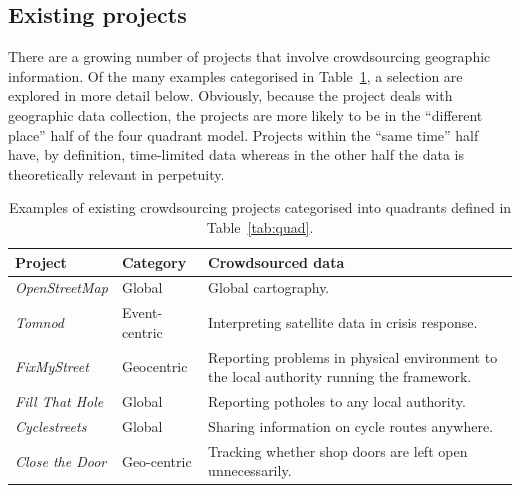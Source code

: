 \documentclass{article}
\begin{document}
		\subsection{Existing projects}
		There are a growing number of projects that involve crowdsourcing geographic information. Of the many examples categorised in Table~\ref{tab:existing-projects}, a selection are explored in more detail below. Obviously, because the project deals with geographic data collection, the projects are more likely to be in the ``different place'' half of the four quadrant model. Projects within the ``same time'' half have, by definition, time-limited data whereas in the other half the data is theoretically relevant in perpetuity.

		\begin{table}[ht]
			\begin{tabularx}{\textwidth}{ | l | l | X |}
				\hline
				\textbf{Project} & \textbf{Category} & \textbf{Crowdsourced data} \\ \hline
				\emph{OpenStreetMap}\cite{_openstreetmap_????} & Global & Global cartography. \\ \hline
				\emph{Tomnod}\cite{_missing_2014} & Event-centric & Interpreting satellite data in crisis response. \\ \hline
				\emph{FixMyStreet}\cite{_mysociety/fixmystreet_2015} & Geocentric & Reporting problems in physical environment to the local authority running the framework. \\ \hline
				\emph{Fill That Hole}\cite{_fill_????} & Global & Reporting potholes to any local authority. \\ \hline
				\emph{Cyclestreets}\cite{_cyclestreets_????} & Global & Sharing information on cycle routes anywhere. \\ \hline
				\emph{Close the Door}\cite{massung_using_2013}\cite{preist_competing_2014} & Geo-centric & Tracking whether shop doors are left open unnecessarily. \\ \hline
			\end{tabularx}
			\caption{Examples of existing crowdsourcing projects categorised into quadrants defined in Table~\ref{tab:quad}.}
			\label{tab:existing-projects}
		\end{table}
\end{document}
